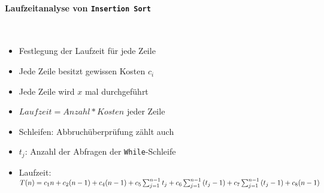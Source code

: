\documentclass[
    ngerman,
    color=3b,
    dark_mode,
    summary,
    boxarc,
]{rubos-tuda-template}
\begin{document}
\paragraph{Laufzeitanalyse von \texttt{Insertion Sort}} {\label{insSortLaufzeit}}\mbox{}
\vspace*{1em}\\
\begin{minipage}[c]{0.3\textwidth}
    \mbox{}
    \centering
    \resetrc
    \label{tab:insertion-sort:laufzeit}
\end{minipage}
\begin{minipage}[c]{0.6\textwidth}
    \begin{itemize}
        \item Festlegung der Laufzeit für jede Zeile
        \item Jede Zeile besitzt gewissen Kosten \texttt{$c_i$}
        \item Jede Zeile wird $x$ mal durchgeführt
        \item $Laufzeit = Anzahl * Kosten$ jeder Zeile
        \item Schleifen: Abbruchüberprüfung zählt auch
        \item \texttt{$t_j$}: Anzahl der Abfragen der \texttt{While}-Schleife
        \item Laufzeit:
              $T(n)=c_{1} n+c_{2}(n-1)+c_{4}(n-1)+c_{5} \sum_{j=1}^{n-1} t_{j}\\ +c_{6} \sum_{j=1}^{n-1}\left(t_{j}-1\right)+c_{7} \sum_{j=1}^{n-1}\left(t_{j}-1\right)+c_{8}(n-1)$
    \end{itemize}
\end{minipage}
\end{document}
